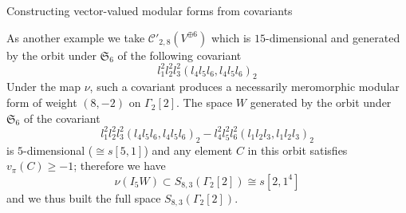 \documentclass[12pt]{amsart}
\numberwithin{equation}{section}
\numberwithin{equation}{section}
\theoremstyle{definition}
\theoremstyle{remark}
\begin{document}
\begin{section}{Constructing vector-valued modular forms from covariants}
\bigskip

As another example we take $\mathcal{C}'_{2,8}(V^{\oplus 6})$ which is $15$-dimensional and generated by
the orbit under $\mathfrak{S}_6$ of the following covariant
\[
l^2_1l^2_2l^2_3(l_4l_5l_6,l_4l_5l_6)_2
\]
Under the map $\nu$, such a covariant produces a necessarily meromorphic modular form of weight $(8,-2)$ on $\Gamma_2[2]$.
The space $W$ generated by the orbit  under $\mathfrak{S}_6$ of the covariant
\[
l^2_1l^2_2l^2_3(l_4l_5l_6,l_4l_5l_6)_2-l^2_4l^2_5l^2_6(l_1l_2l_3,l_1l_2l_3)_2
\]
is $5$-dimensional ($\cong s[5,1]$) and any element $C$ in this orbit satisfies $v_{\pi}(C)\geqslant -1$; 
therefore we have
\[
\nu(I_5W)\subset S_{8,3}(\Gamma_2[2])\cong s[2,1^4]
\]
and we thus  built the full space $S_{8,3}(\Gamma_2[2])$.
\end{section}
\end{document}
